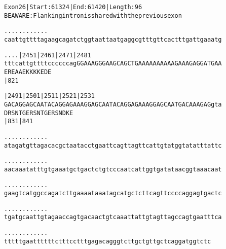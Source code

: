 \documentclass{article}
\begin{document}
\begin{alltt}
Exon 26 | Start: 61324 | End: 61420 | Length: 96
BE AWARE: Flanking intron is shared with the previous exon

.    .    .    .    .    .    .    .    .    .    .    .
caattgttttagaagcagatctggtaattaatgaggcgtttgttcactttgattgaaatg



.    .    .    .             |2451     |2461     |2471     |2481
tttcattgttttccccccagGGAAAGGGAAGCAGCTGAAAAAAAAAAGAAAGAGGATGAA
                     E  R  E  A  A  E  K  K  K  K  E  D  E
                                       |821

         |2491     |2501     |2511     |2521     |2531
GACAGGAGCAATACAGGAGAAAGGAGCAATACAGGAGAAAGGAGCAATGACAAAGAGgta
D  R  S  N  T  G  E  R  S  N  T  G  E  R  S  N  D  K  E
         |831                          |841

 .    .    .    .    .    .    .    .    .    .    .    .
atagatgttagacacgctaatacctgaattcagttagttcattgtatggtatatttattc



 .    .    .    .    .    .    .    .    .    .    .    .
aacaaatatttgtgaaatgctgactctgtcccaatcattggtgatataacggtaaacaat



 .    .    .    .    .    .    .    .    .    .    .    .
gaagtcatggccagatcttgaaaataaatagcatgctcttcagttccccaggagtgactc



 .    .    .    .    .    .    .    .    .    .    .    .
tgatgcaattgtagaaccagtgacaactgtcaaattattgtagttagccagtgaatttca



 .    .    .    .    .    .    .    .    .    .    .    .
tttttgaattttttctttcctttgagacagggtcttgctgttgctcaggatggtctc


\end{alltt}
\newpage
\end{document}
